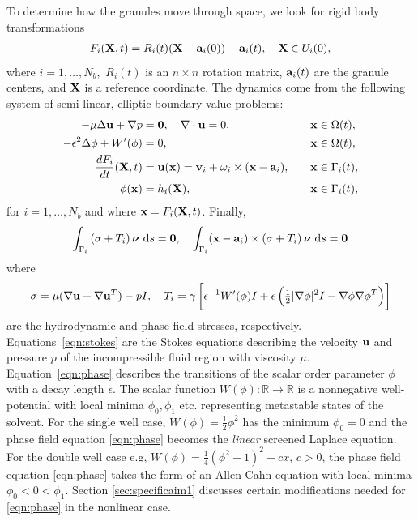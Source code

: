 To determine how the granules move through space,
we look for rigid body transformations
\begin{align}
\label{eq:RBT}
  F_i(\XX,t) = R_i(t)(\XX - \aa_i(0)) + \aa_i(t),\quad \XX \in U_i(0),
\end{align}
where $i = 1,\ldots,N_b,$ $R_i(t)$ is an $n
\times n$ rotation matrix, $\aa_i(t)$ are the granule centers, and $\XX$ is a
reference coordinate.
The dynamics come from the following system of semi-linear, elliptic boundary value problems:
\begin{alignat}{4}
  \label{eqn:stokes} 
  -\mu\Delta \uu + \nabla p &= \mathbf{0}, 
  \quad \nabla \cdot \uu = 0, &&\xx \in \Omega(t), \\
  \label{eqn:phase}
  -\epsilon^2 \Delta \phi + W'(\phi) &= 0, &&\xx \in \Omega(t),\\
  \label{eqn:noslip}        
  \frac{dF_i}{dt}(\XX,t) & = \uu(\xx) = 
    \vv_i + \omega_i \times (\xx - \aa_i), 
  \quad &&\xx \in \Gamma_i(t),\\
  \label{eqn:material}
  \phi(\xx) &= h_i(\XX),  &&\xx \in \Gamma_i(t),
\end{alignat}
for $i=1,\ldots,N_b$ and where $\xx = F_i(\XX,t)$.  Finally,
\begin{align}
\label{eqn:stressbalance}
\int_{\Gamma_i} \left(\sigma  + T_i\right)\nnu \,\dif s = \mathbf{0},\quad
\int_{\Gamma_i} (\xx - \aa_i)\times \left(\sigma + T_i\right) \nnu \,\dif s = \mathbf{0}
\end{align}
where
\begin{align}
\label{eqn:hydro_stress}
\sigma = \mu(\nabla \uu + \nabla \uu^T) - pI,\quad 
T_i = \gamma\left[\epsilon^{-1} W'(\phi)I
  + \epsilon\left(\tfrac{1}{2}|\nabla \phi|^2I - \nabla \phi \nabla
  \phi^T\right)\right]
\end{align}
are the hydrodynamic and phase field stresses, respectively.
Equations~\eqref{eqn:stokes} are the Stokes equations 
describing the velocity $\uu$ and pressure $p$ of
the incompressible fluid region with viscosity $\mu$.
Equation~\eqref{eqn:phase} describes the
transitions of the scalar order parameter $\phi$ with a decay length
$\epsilon$.
The scalar function $W(\phi) : \mathbb{R} \to \mathbb{R}$ is a nonnegative
well-potential with local minima $\phi_0, \phi_1$  etc.
representing metastable states of the solvent.
For the single well case, $W(\phi) = \frac{1}{2}\phi^2$
has the minimum $\phi_0 = 0$ and the phase field equation
\eqref{eqn:phase} becomes the \emph{linear} screened Laplace equation.
For the double well case e.g, $W(\phi) = \frac{1}{4}(\phi^2-1)^2+cx$, $c > 0$,
the phase field equation \eqref{eqn:phase} takes the form of an
Allen-Cahn equation with local minima $\phi_0 < 0 < \phi_1$.
Section \ref{sec:specificaim1} discusses certain
modifications needed for \eqref{eqn:phase} in the nonlinear case.

